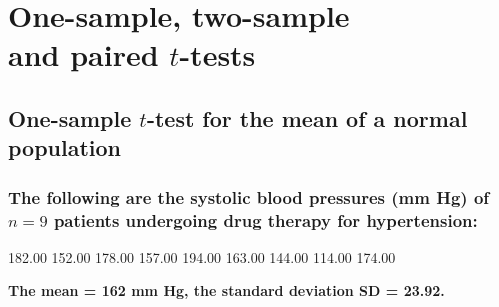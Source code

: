 \chapter[One-sample, two-sample and paired $t$-tests]{One-sample, two-sample\\ and paired $t$-tests}
\section{One-sample $t$-test for the mean of a normal population}
\subsection{The following are the systolic blood pressures (mm Hg) of $n = 9$ patients undergoing drug therapy for hypertension:}

\begin{center}
182.00  152.00  178.00  157.00  194.00  163.00  144.00  114.00  174.00
\end{center}


\textbf{The mean = 162 mm Hg, the standard deviation SD = 23.92.}


